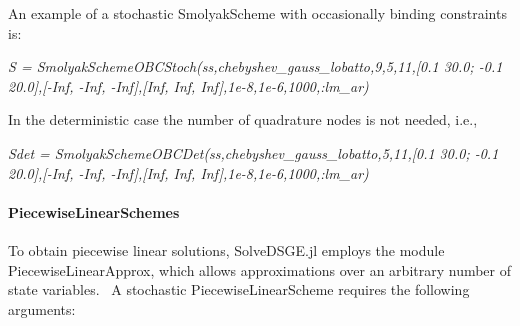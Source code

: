 \documentclass[notitlepage,11pt]{article}
\begin{document}
\bigskip

An example of a stochastic SmolyakScheme with occasionally binding
constraints is:

\bigskip

\textit{S = SmolyakSchemeOBCStoch(ss,chebyshev\_gauss\_lobatto,9,5,11,[0.1
30.0; -0.1 20.0],[-Inf, -Inf, -Inf],[Inf, Inf, Inf],1e-8,1e-6,1000,:lm\_ar)}

\bigskip

In the deterministic case the number of quadrature nodes is not needed, i.e.,

\bigskip

\textit{Sdet = SmolyakSchemeOBCDet(ss,chebyshev\_gauss\_lobatto,5,11,[0.1
30.0; -0.1 20.0],[-Inf, -Inf, -Inf],[Inf, Inf, Inf],1e-8,1e-6,1000,:lm\_ar)}

\paragraph{PiecewiseLinearSchemes}

To obtain piecewise linear solutions, SolveDSGE.jl employs the module
PiecewiseLinearApprox, which allows approximations over an arbitrary number
of state variables. \ A stochastic PiecewiseLinearScheme requires the
following arguments:
\end{document}
